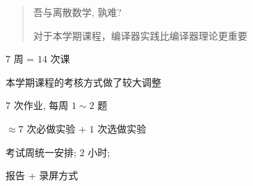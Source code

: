 
\begin{frame}{}
  \begin{columns}
  \end{columns}

  \vspace{0.50cm}
  \begin{quote}
    \centering
    {\large 吾与离散数学, 孰难?}

    \pause
    \vspace{0.50cm}
    对于本学期课程，编译器实践比编译器理论更重要
  \end{quote}
\end{frame}

\begin{frame}{}
  \begin{center}
    {\large $7$ 周 = $14$ 次课 \red{$<$} }


    \vspace{0.30cm}
    {\large 本学期课程的考核方式做了较大调整}
  \end{center}
\end{frame}

\begin{frame}{}
  \begin{description}[<+->]
    \setlength{\itemsep}{25pt}
    \item[\cyan{\bf 平时作业 ($00$ 分):}] $7$ 次作业, 每周 $1 \sim 2$ 题
    \item[\red{\bf 课程实验 ($60$ 分):}] $\approx 7$ 次必做实验 + $1$ 次选做实验 
    \item[\red{\bf 期末测试 ($40$ 分):}] 考试周统一安排; $2$ 小时; 
    \item[\teal{\bf 附加作业 ($05$ 分):}] 报告 + 录屏方式
  \end{description}
\end{frame}

